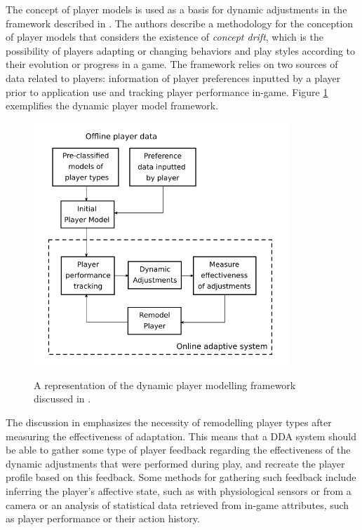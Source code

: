 The concept of player models is used as a basis for dynamic adjustments in the framework described in \citet{ARTICLE_DynamicPlayerModelling}. The authors describe a methodology for the conception of player models that considers the existence of \emph{concept drift}, which is the possibility of players adapting or changing behaviors and play styles according to their evolution or progress in a game. The framework relies on two sources of data related to players: information of player preferences inputted by a player prior to application use and tracking player performance in-game. Figure \ref{fig:dynamic-player-model} exemplifies the dynamic player model framework.

\begin{figure}[!ht]
    \begin{center}
    \caption{A representation of the dynamic player modelling framework discussed in \citet{ARTICLE_DynamicPlayerModelling}.}
        \includegraphics[width=26em]{figures/fig-dynamic-player-model.png}
        \label{fig:dynamic-player-model}
    \end{center}
\end{figure}

The discussion in \citet{ARTICLE_DynamicPlayerModelling} emphasizes the necessity of remodelling player types after measuring the effectiveness of adaptation. This means that a DDA system should be able to gather some type of player feedback regarding the effectiveness of the dynamic adjustments that were performed during play, and recreate the player profile based on this feedback. Some methods for gathering such feedback include inferring the player's affective state, such as with physiological sensors or from a camera or an analysis of statistical data retrieved from in-game attributes, such as player performance or their action history.

